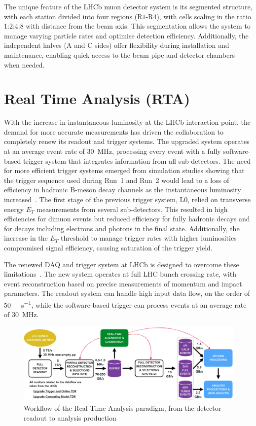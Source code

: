 The unique feature of the LHCb muon detector system is its segmented structure, with each station divided into four regions (R$1$-R$4$), with cells scaling in the ratio 1:2:4:8 with distance from the beam axis. This segmentation allows the system to manage varying particle rates and optimise detection efficiency. Additionally, the independent halves (A and C sides) offer flexibility during installation and maintenance, enabling quick access to the beam pipe and detector chambers when needed.


\section[Real Time Analysis]{Real Time Analysis (RTA)}\label{sec:rta}

With the increase in instantaneous luminosity at the LHCb interaction point, the demand for more accurate measurements has driven the collaboration to completely renew its readout and trigger systems. The upgraded system operates at an average event rate of \SI{30}{\mega\hertz}, processing every event with a fully software-based trigger system that integrates information from all sub-detectors. The need for more efficient trigger systems emerged from simulation studies showing that the trigger sequence used during Run~1 and Run~2 would lead to a loss of efficiency in hadronic B-meson decay channels as the instantaneous luminosity increased~\cite{CERN-LHCC-2011-001}. The first stage of the previous trigger system, L$0$, relied on transverse energy $E_T$ measurements from several sub-detectors. This resulted in high efficiencies for dimuon events but reduced efficiency for fully hadronic decays and for decays including electrons and photons in the final state. Additionally, the increase in the $E_T$ threshold to manage trigger rates with higher luminosities compromised signal efficiency, causing saturation of the trigger yield.

The renewed DAQ and trigger system at LHCb is designed to overcome these limitations~\cite{CERN-LHCC-2018-014}. The new system operates at full LHC bunch crossing rate, with event reconstruction based on precise measurements of momentum and impact parameters. The readout system can handle high input data flow, on the order of \SI[per-mode=symbol]{50}{\tera\byte\per\second}, while the software-based trigger can process events at an average rate of \SI{30}{\mega\hertz}. 

\begin{figure}
    \centering
    \includegraphics[width=\textwidth]{figures/hidef_RTA_dataflow_widescreen.png}
    \caption{Workflow of the Real Time Analysis paradigm, from the detector readout to analysis production}
    \label{fig:RTA}
\end{figure}

